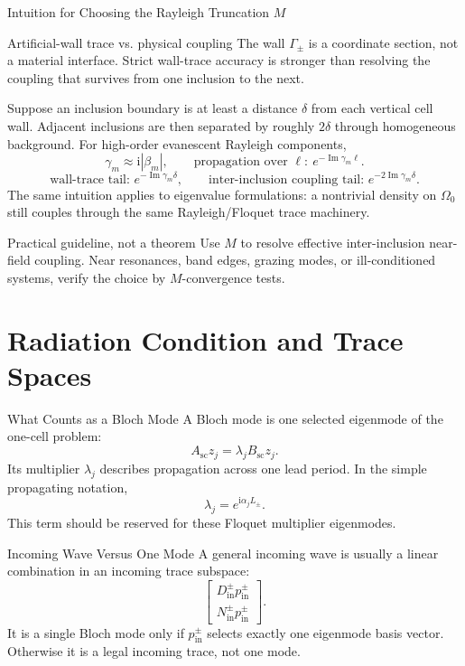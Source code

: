 \documentclass[aspectratio=169]{beamer}
\newcommand{\ii}{\mathrm{i}}
\begin{document}
\begin{frame}{Intuition for Choosing the Rayleigh Truncation \(M\)}
  \footnotesize
  \begin{block}{Artificial-wall trace vs. physical coupling}
    The wall \(\Gamma_\pm\) is a coordinate section, not a material interface.
    Strict wall-trace accuracy is stronger than resolving the coupling that
    survives from one inclusion to the next.
  \end{block}
  Suppose an inclusion boundary is at least a distance \(\delta\) from each
  vertical cell wall. Adjacent inclusions are then separated by roughly
  \(2\delta\) through homogeneous background.
  For high-order evanescent Rayleigh components,
  \[
    \gamma_m\approx \ii|\beta_m|,
    \qquad
    \text{propagation over }\ell:\ e^{-\operatorname{Im}\gamma_m\ell}.
  \]
  \[
    \text{wall-trace tail: } e^{-\operatorname{Im}\gamma_m\delta},
    \qquad
    \text{inter-inclusion coupling tail: } e^{-2\operatorname{Im}\gamma_m\delta}.
  \]
  The same intuition applies to eigenvalue formulations: a nontrivial density
  on \(\Omega_0\) still couples through the same Rayleigh/Floquet trace
  machinery.
  \begin{alertblock}{Practical guideline, not a theorem}
    Use \(M\) to resolve effective inter-inclusion near-field coupling.
    Near resonances, band edges, grazing modes, or ill-conditioned systems,
    verify the choice by \(M\)-convergence tests.
  \end{alertblock}
\end{frame}

\section{Radiation Condition and Trace Spaces}

\begin{frame}{What Counts as a Bloch Mode}
  A Bloch mode is one selected eigenmode of the one-cell problem:
  \[
    A_{\mathrm{sc}}z_j=\lambda_j B_{\mathrm{sc}}z_j.
  \]
  Its multiplier \(\lambda_j\) describes propagation across one lead period.
  In the simple propagating notation,
  \[
    \lambda_j=e^{\ii\alpha_j L_\pm}.
  \]
  This term should be reserved for these Floquet multiplier eigenmodes.
\end{frame}

\begin{frame}{Incoming Wave Versus One Mode}
  A general incoming wave is usually a linear combination in an incoming trace subspace:
  \[
    \begin{bmatrix}
      D_{\mathrm{in}}^\pm p_{\mathrm{in}}^\pm\\
      N_{\mathrm{in}}^\pm p_{\mathrm{in}}^\pm
    \end{bmatrix}.
  \]
  It is a single Bloch mode only if \(p_{\mathrm{in}}^\pm\) selects exactly one eigenmode basis vector.
  Otherwise it is a legal incoming trace, not one mode.
\end{frame}
\end{document}

